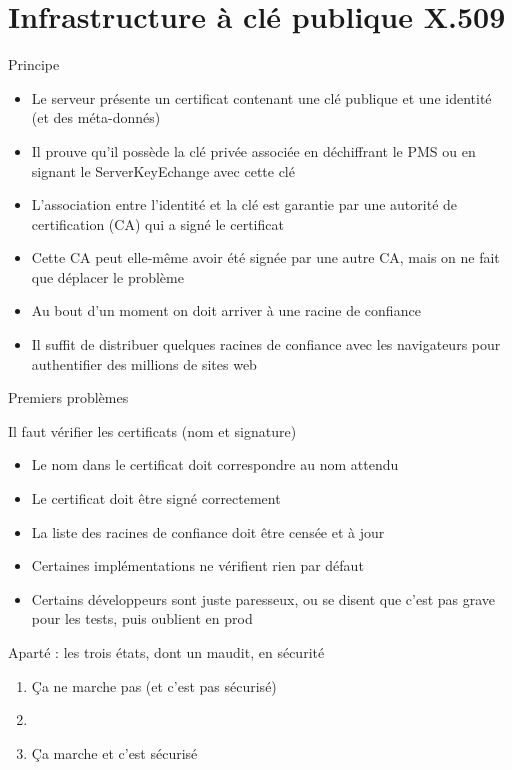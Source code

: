 \documentclass{mpg-ep-slides}
\begin{document}
\section[PKIX]{Infrastructure à clé publique X.509}
\tocsect

\begin{frame}{Principe}
  \begin{itemize}
    \item Le serveur présente un certificat contenant une clé publique et une
      identité (et des méta-donnés)
    \item Il prouve qu'il possède la clé privée associée en déchiffrant le
      PMS ou en signant le ServerKeyEchange avec cette clé
    \item L'association entre l'identité et la clé est garantie par une
      autorité de certification (CA) qui a signé le certificat
    \item Cette CA peut elle-même avoir été signée par une autre CA, mais on
      ne fait que déplacer le problème
    \item Au bout d'un moment on doit arriver à une racine de confiance
    \item Il suffit de distribuer quelques racines de confiance avec les
      navigateurs pour authentifier des millions de sites web
  \end{itemize}
\end{frame}

\begin{frame}{Premiers problèmes}
  \begin{block}{Il faut vérifier les certificats (nom et signature)}
    \begin{itemize}
      \item Le nom dans le certificat doit correspondre au nom attendu
      \item Le certificat doit être signé correctement
      \item La liste des racines de confiance doit être censée et à jour
      \item Certaines implémentations ne vérifient rien par défaut
      \item Certains développeurs sont juste paresseux, ou se disent que c'est
        pas grave pour les tests, puis oublient en prod
    \end{itemize}
  \end{block}

  \begin{block}{Aparté : les trois états, dont un maudit, en sécurité}
    \begin{overprint}
      \begin{enumerate}
        \item Ça ne marche pas (et c'est pas sécurisé)
        \item {}
        \item Ça marche et c'est sécurisé
      \end{enumerate}
    \end{overprint}
  \end{block}
\end{frame}
\end{document}
